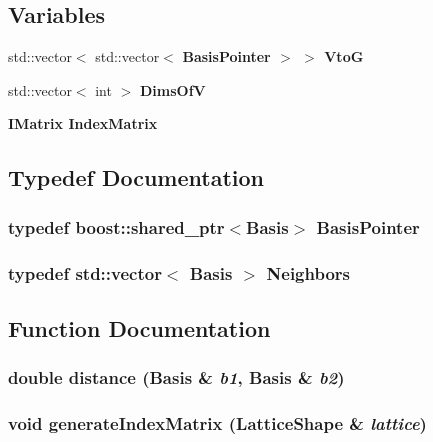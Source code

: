 \subsection*{Variables}
\begin{CompactItemize}
\item 
std::vector$<$ std::vector$<$ \bf{Basis\-Pointer} $>$ $>$ \bf{Vto\-G}
\item 
std::vector$<$ int $>$ \bf{Dims\-Of\-V}
\item 
\bf{IMatrix} \bf{Index\-Matrix}
\end{CompactItemize}


\subsection{Typedef Documentation}
\subsubsection{\setlength{\rightskip}{0pt plus 5cm}typedef boost::shared\_\-ptr$<$\bf{Basis}$>$ \bf{Basis\-Pointer}}\label{basis_8h_40068f76f272f428c9643efcea2c1c61}


\subsubsection{\setlength{\rightskip}{0pt plus 5cm}typedef std::vector$<$ \bf{Basis} $>$ \bf{Neighbors}}\label{basis_8h_c698caec08908e4ccf55fdf81d37b770}




\subsection{Function Documentation}
\subsubsection{\setlength{\rightskip}{0pt plus 5cm}double distance (\bf{Basis} \& {\em b1}, \bf{Basis} \& {\em b2})}\label{basis_8h_e9c7fa4f242e67d65fcefe7f853523f8}


\subsubsection{\setlength{\rightskip}{0pt plus 5cm}void generate\-Index\-Matrix (\bf{Lattice\-Shape} \& {\em lattice})}\label{basis_8h_5104afb9f6ff60c6903d70feb9d37576}


